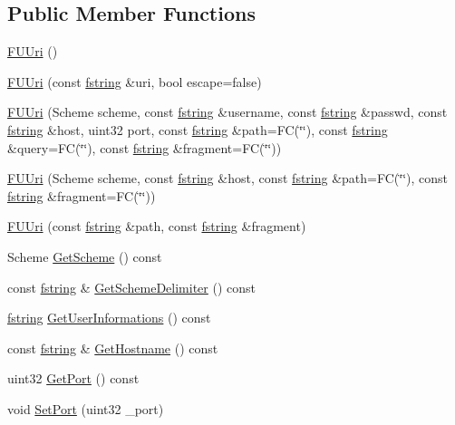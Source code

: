 \subsection*{Public Member Functions}
\begin{DoxyCompactItemize}
\item 
\hyperlink{classFUUri_ae5c5cc15c9b67d65809b543a77961558}{FUUri} ()
\item 
\hyperlink{classFUUri_a531ed87e083ea90f97e7b3a84efe1b10}{FUUri} (const \hyperlink{classfm_1_1stringT}{fstring} \&uri, bool escape=false)
\item 
\hyperlink{classFUUri_a9b85b52fb5172ce29da41202cd56523f}{FUUri} (Scheme scheme, const \hyperlink{classfm_1_1stringT}{fstring} \&username, const \hyperlink{classfm_1_1stringT}{fstring} \&passwd, const \hyperlink{classfm_1_1stringT}{fstring} \&host, uint32 port, const \hyperlink{classfm_1_1stringT}{fstring} \&path=FC(\char`\"{}\char`\"{}), const \hyperlink{classfm_1_1stringT}{fstring} \&query=FC(\char`\"{}\char`\"{}), const \hyperlink{classfm_1_1stringT}{fstring} \&fragment=FC(\char`\"{}\char`\"{}))
\item 
\hyperlink{classFUUri_a87fc11805cbca92496c04a1e7fc7bd5b}{FUUri} (Scheme scheme, const \hyperlink{classfm_1_1stringT}{fstring} \&host, const \hyperlink{classfm_1_1stringT}{fstring} \&path=FC(\char`\"{}\char`\"{}), const \hyperlink{classfm_1_1stringT}{fstring} \&fragment=FC(\char`\"{}\char`\"{}))
\item 
\hyperlink{classFUUri_a929dd14eeeb5d807464733957a2cc469}{FUUri} (const \hyperlink{classfm_1_1stringT}{fstring} \&path, const \hyperlink{classfm_1_1stringT}{fstring} \&fragment)
\item 
Scheme \hyperlink{classFUUri_a830ec370d50c4e6a9df30ba5642db112}{GetScheme} () const 
\item 
const \hyperlink{classfm_1_1stringT}{fstring} \& \hyperlink{classFUUri_aeff5653562fbcde334cad28921e9d2da}{GetSchemeDelimiter} () const 
\item 
\hyperlink{classfm_1_1stringT}{fstring} \hyperlink{classFUUri_aaaf0c3bab2d28e637f3b461f399bc5c6}{GetUserInformations} () const 
\item 
const \hyperlink{classfm_1_1stringT}{fstring} \& \hyperlink{classFUUri_a97836a9179f7b480cc58f8ad00fb6813}{GetHostname} () const 
\item 
uint32 \hyperlink{classFUUri_afe6e05dc3151114388d1497b3b426ee2}{GetPort} () const 
\item 
void \hyperlink{classFUUri_a4e2d33080599e5ed46a09ef33ace865e}{SetPort} (uint32 \_\-port)

\end{DoxyCompactItemize}
